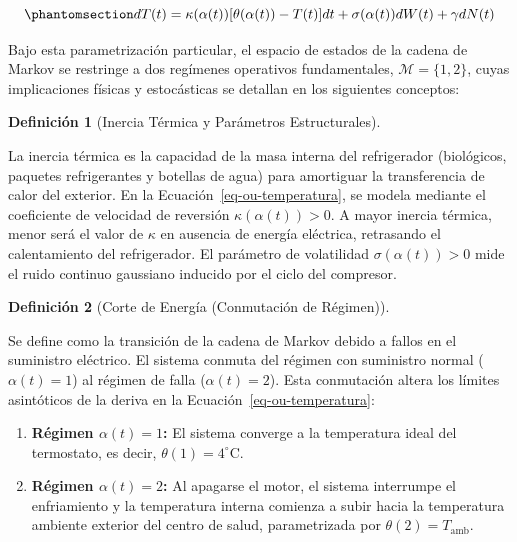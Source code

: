 \documentclass[
  spanish,
  letterpaper,
  DIV=11,
  numbers=noendperiod]{scrreprt}
\providecommand{\tightlist}{%
  \setlength{\itemsep}{0pt}\setlength{\parskip}{0pt}}
\theoremstyle{plain}
\theoremstyle{definition}
\newtheorem{definition}{Definición}[chapter]
\theoremstyle{remark}
\begin{document}
\begin{equation}\phantomsection\label{eq-ou-temperatura}{
dT(t) = \kappa(\alpha(t)) [\theta(\alpha(t)) - T(t)] dt + \sigma(\alpha(t)) dW(t) + \gamma dN(t)
}\end{equation}

Bajo esta parametrización particular, el espacio de estados de la cadena
de Markov se restringe a dos regímenes operativos fundamentales,
\(\mathcal{M} = \{1, 2\}\), cuyas implicaciones físicas y estocásticas
se detallan en los siguientes conceptos:

\begin{definition}[Inercia Térmica y Parámetros
Estructurales]\protect\hypertarget{def-inercia-termica}{}\label{def-inercia-termica}

La inercia térmica es la capacidad de la masa interna del refrigerador
(biológicos, paquetes refrigerantes y botellas de agua) para amortiguar
la transferencia de calor del exterior. En la
Ecuación~\ref{eq-ou-temperatura}, se modela mediante el coeficiente de
velocidad de reversión \(\kappa(\alpha(t)) > 0\). A mayor inercia
térmica, menor será el valor de \(\kappa\) en ausencia de energía
eléctrica, retrasando el calentamiento del refrigerador. El parámetro de
volatilidad \(\sigma(\alpha(t)) > 0\) mide el ruido continuo gaussiano
inducido por el ciclo del compresor.

\end{definition}

\begin{definition}[Corte de Energía (Conmutación de
Régimen)]\protect\hypertarget{def-cortes-energia}{}\label{def-cortes-energia}

Se define como la transición de la cadena de Markov debido a fallos en
el suministro eléctrico. El sistema conmuta del régimen con suministro
normal (\(\alpha(t) = 1\)) al régimen de falla (\(\alpha(t) = 2\)). Esta
conmutación altera los límites asintóticos de la deriva en la
Ecuación~\ref{eq-ou-temperatura}:

\begin{enumerate}
\def\labelenumi{\arabic{enumi}.}
\tightlist
\item
  \textbf{Régimen \(\alpha(t) = 1\):} El sistema converge a la
  temperatura ideal del termostato, es decir,
  \(\theta(1) = 4^\circ\text{C}\).
\item
  \textbf{Régimen \(\alpha(t) = 2\):} Al apagarse el motor, el sistema
  interrumpe el enfriamiento y la temperatura interna comienza a subir
  hacia la temperatura ambiente exterior del centro de salud,
  parametrizada por \(\theta(2) = T_{\text{amb}}\).
\end{enumerate}

\end{definition}
\end{document}
